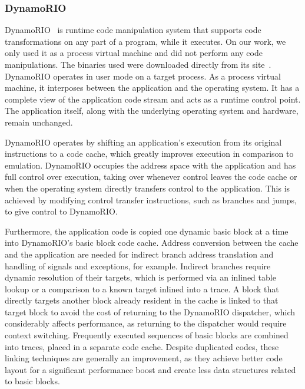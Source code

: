 \documentclass[11pt,twoside]{article}
\begin{document}
\subsubsection{DynamoRIO}
	\label{sec:dynamorio}
  DynamoRIO~\cite{dynamorio} is runtime code manipulation
  system that supports code transformations on any part of a
  program, while it executes.
  On our work, we only used it as a process virtual machine and
  did not perform any code manipulations.
  The binaries used were downloaded directly from its
  site~\cite{dynsrc}.
  DynamoRIO operates in user mode on a target process.
  As a process virtual machine, it interposes between the
  application and the operating system.
  It has a complete view of the application code stream and acts
  as a runtime control point.
  The application itself, along with the underlying
  operating system and hardware, remain unchanged.
  
  DynamoRIO operates by shifting an application's execution from
  its original instructions to a code cache, which greatly improves
  execution in comparison to emulation.
  DynamoRIO occupies the address space with the
  application and has full control over execution, taking over
  whenever control leaves the code cache or when the
  operating system directly transfers control to the application.
  This is achieved by modifying control transfer instructions, such
  as branches and jumps, to give control to DynamoRIO.

  Furthermore,
  the application code is copied one dynamic basic block
  at a time into DynamoRIO's basic block code cache. Address
  conversion between the cache and the application are needed for  
  indirect branch address translation and handling of signals
  and exceptions, for example.
  Indirect branches require dynamic resolution of their targets,
  which is performed via an inlined table lookup or
  a comparison to a known target inlined into a trace.
  A block that directly targets another block already resident
  in the cache is linked to that target block to avoid the cost of
  returning to the DynamoRIO dispatcher, which considerably
  affects performance, as returning to the dispatcher
  would require context switching.
  Frequently executed sequences of basic blocks are combined
  into traces, placed in a separate code cache. Despite 
  duplicated codes, these linking techniques are generally an
  improvement, as they achieve better code layout for a
  significant performance boost and create less data structures
  related to basic blocks.
\end{document}

